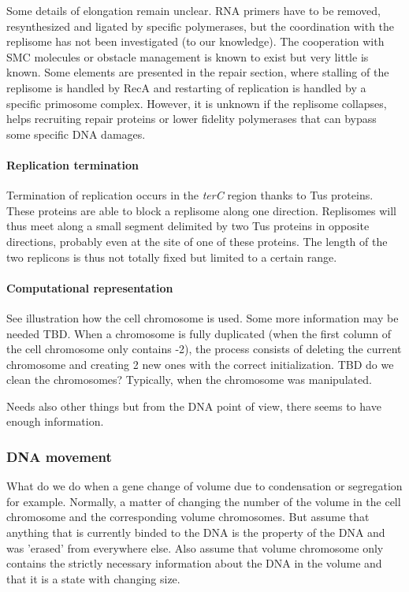 Some details of elongation remain unclear. RNA primers have to be removed, resynthesized and ligated by specific polymerases, but the coordination with the replisome has not been investigated (to our knowledge). The cooperation with SMC molecules or obstacle management is known to exist but very little is known. Some elements are presented in the repair section, where stalling of the replisome is handled by RecA and restarting of replication is handled by a specific primosome complex. However, it is unknown if the replisome collapses, helps recruiting repair proteins or lower fidelity polymerases that can bypass some specific DNA damages.

\paragraph{Replication termination} Termination of replication occurs in the \textit{terC} region thanks to Tus proteins. These proteins are able to block a replisome along one direction. Replisomes will thus meet along a small segment delimited by two Tus proteins in opposite directions, probably even at the site of one of these proteins. The length of the two replicons is thus not totally fixed but limited to a certain range.


\paragraph{Computational representation}
See illustration how the cell chromosome is used. Some more information may be needed TBD.
When a chromosome is fully duplicated (when the first column of the cell chromosome only contains -2), the process consists of deleting the current chromosome and creating 2 new ones with the correct initialization. TBD do we clean the chromosomes? Typically, when the chromosome was manipulated.

Needs also other things but from the DNA point of view, there seems to have enough information.

\subsubsection{DNA movement}
\textcolor[rgb]{1.00,0.00,0.00}{What do we do when a gene change of volume due to condensation or segregation for example. Normally, a matter of changing the number of the volume in the cell chromosome and the corresponding volume chromosomes. But assume that anything that is currently binded to the DNA is the property of the DNA and was 'erased' from everywhere else. Also assume that volume chromosome only contains the strictly necessary information about the DNA in the volume and that it is a state with changing size.}

